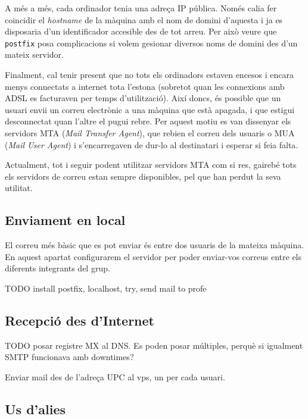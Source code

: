 \documentclass{practicaitic}
\begin{document}
A més a més, cada ordinador tenia una adreça IP pública. Només calia
fer coincidir el \textit{hostname} de la màquina amb el nom de domini
d'aquesta i ja es disposaria d'un identificador accesible des de tot
arreu. Per això veure que \texttt{postfix} posa complicacions si volem
gesionar diversos noms de domini des d'un mateix servidor.

Finalment, cal tenir present que no tots els ordinadors estaven
encesos i encara menys connectats a internet tota l'estona (sobretot
quan les connexions amb ADSL es facturaven per temps d'utilització).
Així doncs, és possible que un usuari envii un correu electrònic a
una màquina que està apagada, i que estigui desconnectat quan l'altre
el pugui rebre. Per aquest motiu es van dissenyar els servidors MTA
(\textit{Mail Transfer Agent}), que rebien el correu dels usuaris o
MUA (\textit{Mail User Agent}) i s'encarregaven de dur-lo al
destinatari i esperar si feia falta.

Actualment, tot i seguir podent utilitzar servidors MTA com si res,
gairebé tots els servidors de correu estan sempre disponibles, pel
que han perdut la seva utilitat.

\subsection{Enviament en local}

El correu més bàsic que es pot enviar és entre dos usuaris de la
mateixa màquina. En aquest apartat configurarem el servidor
per poder enviar-vos correus entre els diferents integrants
del grup.

\begin{tasca}
  TODO install postfix, localhost, try, send mail to profe
\end{tasca}

\subsection{Recepció des d'Internet}

\begin{previ}
  TODO posar registre MX al DNS. Es poden posar múltiples,
  perquè si igualment SMTP funcionava amb downtimes?
\end{previ}

\begin{tasca}
  Enviar mail des de l'adreça UPC al vps, un per cada usuari.
\end{tasca}

\subsection{Us d'alies}
\end{document}
